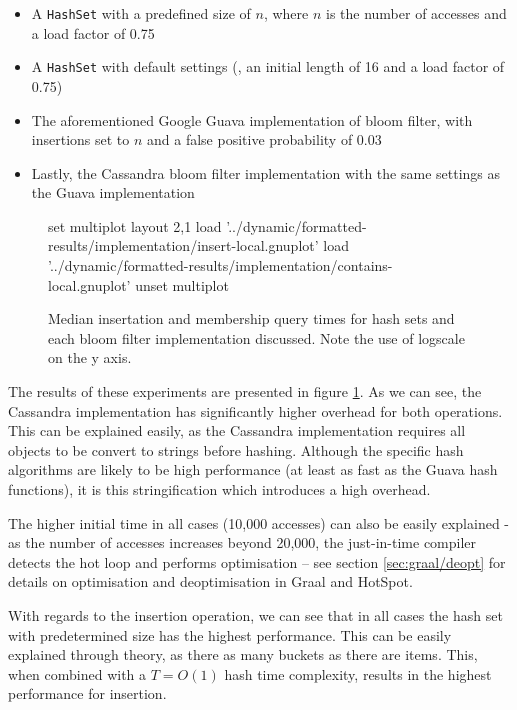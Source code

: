 \begin{itemize}
	\item A \texttt{HashSet} with a predefined size of $n$, where $n$ is the number of accesses and a load factor of 0.75
	\item A \texttt{HashSet} with default settings (\ie, an initial length of 16 and a load factor of 0.75)
	\item The aforementioned Google Guava implementation of bloom filter, with insertions set to $n$ and a false positive probability of 0.03
	\item Lastly, the Cassandra bloom filter implementation with the same settings as the Guava implementation
\end{itemize}

\begin{figure}
	\centering
	\begin{gnuplot}[terminal=pdf]
	set multiplot layout 2,1
		load '../dynamic/formatted-results/implementation/insert-local.gnuplot'
		load '../dynamic/formatted-results/implementation/contains-local.gnuplot'
	unset multiplot
	\end{gnuplot}
	\caption{Median insertation and membership query times for hash sets and each bloom filter implementation discussed. Note the use of logscale on the y axis.}
	\label{chart:implementation-insert}
\end{figure}

The results of these experiments are presented in figure \ref{chart:implementation-insert}. As we can see, the Cassandra implementation has significantly higher overhead for both operations. This can be explained easily, as the Cassandra implementation requires all objects to be convert to strings before hashing. Although the specific hash algorithms are likely to be high performance (at least as fast as the Guava hash functions), it is this stringification which introduces a high overhead.

The higher initial time in all cases (10,000 accesses) can also be easily explained - as the number of accesses increases beyond 20,000, the just-in-time compiler detects the hot loop and performs optimisation -- see section \ref{sec:graal/deopt} for details on optimisation and deoptimisation in Graal and HotSpot.

With regards to the insertion operation, we can see that in all cases the hash set with predetermined size has the highest performance. This can be easily explained through theory, as there as many buckets as there are items. This, when combined with a $T=O(1)$ hash time complexity, results in the highest performance for insertion.

